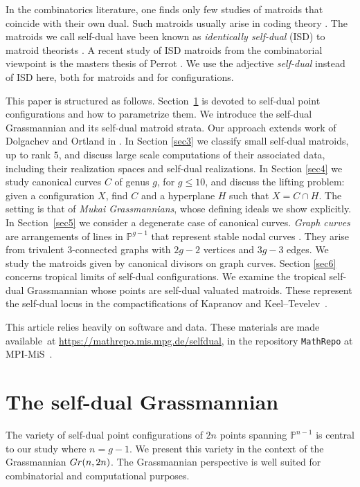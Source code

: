 \documentclass[12pt]{extarticle}
\theoremstyle{definition}
\numberwithin{theorem}{section}
\theoremstyle{plain}\newtheorem{ithm}{Theorem}
\newcommand{\PP}{\mathbb{P}}
\begin{document}
In the combinatorics literature, one finds only few studies of matroids that coincide
with their own dual. Such matroids usually arise in
coding theory \cite{PG}. The matroids we call self-dual have
been known as {\em identically self-dual} (ISD)
to matroid theorists  \cite{Lind}.
A recent study of ISD matroids from the combinatorial 
viewpoint is the masters thesis of Perrot \cite{Per}.
We use the adjective {\em self-dual} instead of ISD here,
both for matroids and for configurations.

\smallskip

This paper is structured as follows. Section~\ref{sec2} is devoted to self-dual 
point configurations and  how to parametrize them. We introduce the
self-dual Grassmannian and its self-dual matroid strata.
Our approach extends work of Dolgachev and Ortland in \cite[Section III.2]{DO}.
 In Section \ref{sec3} we classify small self-dual matroids, up to rank $5$, and discuss large scale computations of their associated data, including their realization spaces and self-dual realizations.
In Section \ref{sec4} we study  canonical curves $C$ of genus $g$,
for $g\leq 10$, and discuss the lifting problem:
given a configuration $X$, find $C$ and a 
hyperplane $H$ such that $X = C \cap H$.
The setting is that of {\em Mukai Grassmannians}, whose defining ideals we show explicitly.
In Section~\ref{sec5} we consider a degenerate case of canonical curves.
{\em Graph curves} are arrangements of lines in $\PP^{g-1}$
that represent stable nodal curves \cite{BE}.  They arise from
trivalent $3$-connected graphs with $2g-2$ vertices and $3g-3$ edges.
We study the matroids  given by
canonical divisors on graph curves.
 Section \ref{sec6} concerns tropical limits of self-dual configurations.
We examine the tropical self-dual Grassmannian whose points are self-dual valuated matroids.
These represent the self-dual locus in the compactifications of Kapranov \cite{Kap}
and Keel--Tevelev~\cite{KT}.

This article relies heavily on software and data. These materials
are made available~at \url{https://mathrepo.mis.mpg.de/selfdual},
in the repository
{\tt MathRepo} at MPI-MiS~\cite{MathRepo}.
 

\section{The self-dual Grassmannian}
\label{sec2}


The variety of self-dual point configurations 
of $2n$ points spanning $\PP^{n-1}$
is central to our study where $n = g-1$. We present this
variety in the context of the Grassmannian
${\rm Gr}(n,2n)$.  
The Grassmannian perspective is well suited
for combinatorial and computational purposes.
\end{document}

